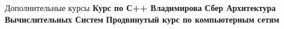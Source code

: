 
\begin{rubric}{Дополнительные курсы}
\entry*[5 --6 семестры ]%
	\textbf{Курс по С++ Владимирова}
%
\entry*[6 семестр]%
	\textbf{Сбер Архитектура Вычислительных Систем} 
\entry*[5--6 семестры]%
	\textbf{Продвинутый курс по компьютерным сетям}
% 
\end{rubric}